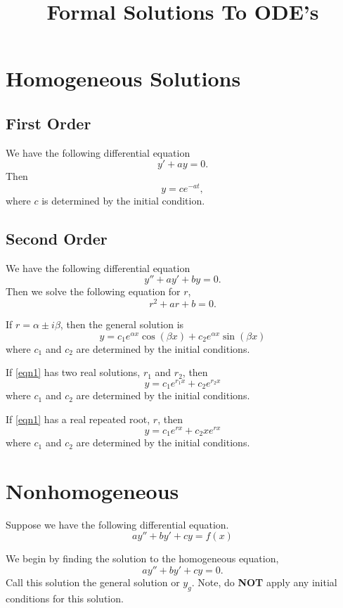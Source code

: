 \documentclass{article}
\title{Formal Solutions To ODE's}
\date{}
\begin{document}
\maketitle

\section{Homogeneous Solutions}

\subsection{First Order}

We have the following differential equation
\[
	y'+ay=0.
\]
Then
\[
	y=c e^{-at},
\]
where $c$ is determined by the initial condition.

\subsection{Second Order}

We have the following differential equation
\begin{equation}
	y''+ay'+by=0. \label{eqn1}
\end{equation}
Then we solve the following equation for $r$,
\[
	r^2+ar+b=0.
\]

If $r=\alpha\pm i\beta$, then the general solution is
\[
	y=c_1 e^{\alpha x}\cos(\beta x)+c_2 e^{\alpha x}\sin(\beta x)
\]
where $c_1$ and $c_2$ are determined by the initial conditions.

If \autoref{eqn1} has two real solutions, $r_1$ and $r_2$, then
\[
	y=c_1e^{r_1 x}+c_2 e^{r_2x}
\]
where $c_1$ and $c_2$ are determined by the initial conditions.

If \autoref{eqn1} has a real repeated root, $r$, then
\[
	y=c_1e^{rx}+c_2xe^{rx}
\]
where $c_1$ and $c_2$ are determined by the initial conditions.

\section{Nonhomogeneous}

Suppose we have the following differential equation.
\begin{equation}\label{eqn2}
	ay'' + by' +cy = f(x)
\end{equation}

We begin by finding the solution to the homogeneous equation,
\[
	ay'' + by' +cy = 0.
\]
Call this solution the general solution or $y_g$.
Note, do \textbf{NOT} apply any initial conditions for this solution.
\end{document}
